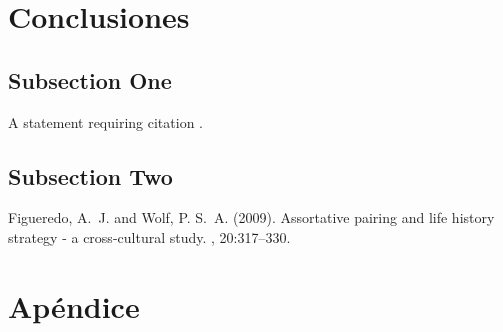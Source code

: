 \documentclass[twoside,twocolumn,a4paper]{article}
\begin{document}
\section{Conclusiones}

\subsection{Subsection One}

A statement requiring citation \cite{Figueredo:2009dg}.
\blindtext %

\subsection{Subsection Two}

\blindtext %


\begin{thebibliography}{99} %

Figueredo, A.~J. and Wolf, P. S.~A. (2009).
\newblock Assortative pairing and life history strategy - a cross-cultural
  study.
, 20:317--330.
 
\end{thebibliography}


\section{Ap\'endice}
\end{document}
